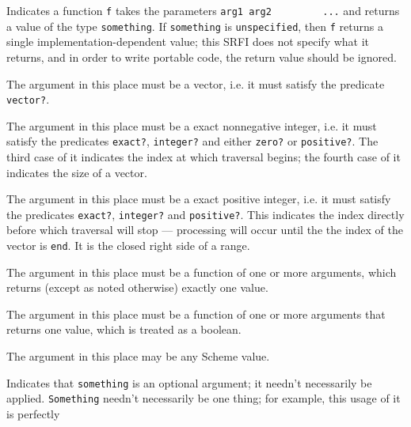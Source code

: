 \begin{description}
\tightlist
\item[ (f arg\textsubscript{1} arg\textsubscript{2} \ldots{})
-\textgreater{} something]
Indicates a function \texttt{f} takes the parameters
\texttt{arg1\ arg2\ \ \ \ \ \ \ \ \ ...} and returns a value of the type
\texttt{something}. If \texttt{something} is \texttt{unspecified}, then
\texttt{f} returns a single implementation-dependent value; this SRFI
does not specify what it returns, and in order to write portable code,
the return value should be ignored.\\[2\baselineskip]
\item[vec]
The argument in this place must be a vector, i.e. it must satisfy the
predicate \texttt{vector?}.\\[2\baselineskip]
\item[i, j, start, size]
The argument in this place must be a exact nonnegative integer, i.e. it
must satisfy the predicates \texttt{exact?}, \texttt{integer?} and
either \texttt{zero?} or \texttt{positive?}. The third case of it
indicates the index at which traversal begins; the fourth case of it
indicates the size of a vector.\\[2\baselineskip]
\item[end]
The argument in this place must be a exact positive integer, i.e. it
must satisfy the predicates \texttt{exact?}, \texttt{integer?} and
\texttt{positive?}. This indicates the index directly before which
traversal will stop --- processing will occur until the the index of the
vector is \texttt{end}. It is the closed right side of a
range.\\[2\baselineskip]
\item[f]
The argument in this place must be a function of one or more arguments,
which returns (except as noted otherwise) exactly one
value.\\[2\baselineskip]
\item[pred?]
The argument in this place must be a function of one or more arguments
that returns one value, which is treated as a boolean.\\[2\baselineskip]
\item[ x, y, z, seed, knil, fill, key, value ]
The argument in this place may be any Scheme value.\\[2\baselineskip]
\item[{[}something{]}]
Indicates that \texttt{something} is an optional argument; it needn't
necessarily be applied. \texttt{Something} needn't necessarily be one
thing; for example, this usage of it is perfectly

\end{description}
